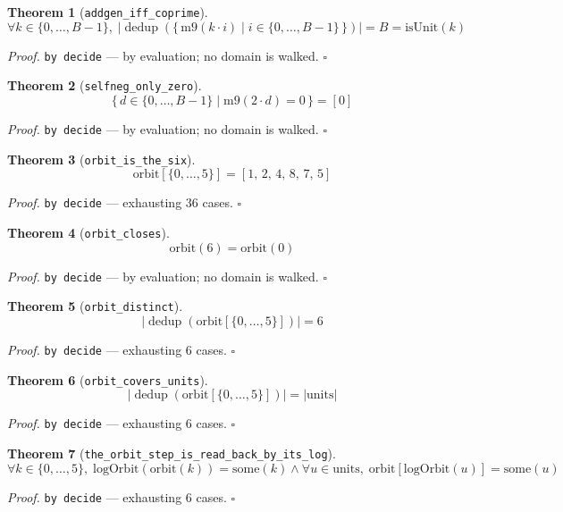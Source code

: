 \documentclass[11pt]{article}
\newtheorem{theorem}{Theorem}[section]
\begin{document}
\begin{theorem}[\texttt{addgen\_iff\_coprime}]
\[ \forall k \in \{0,\dots,B-1\},\; \left|\operatorname{dedup}\left(\{\, \mathrm{m9}\mathopen{}\left(k \cdot i\right) \mid i \in \{0,\dots,B-1\} \,\}\right)\right| = B = \mathrm{isUnit}\mathopen{}\left(k\right) \]
\end{theorem}
\noindent\emph{Proof.} \texttt{by decide} --- by evaluation; no domain is walked. \hfill$\square$

\begin{theorem}[\texttt{selfneg\_only\_zero}]
\[ \{\, d \in \{0,\dots,B-1\} \mid \mathrm{m9}\mathopen{}\left(2 \cdot d\right) = 0 \,\} = [0] \]
\end{theorem}
\noindent\emph{Proof.} \texttt{by decide} --- by evaluation; no domain is walked. \hfill$\square$

\begin{theorem}[\texttt{orbit\_is\_the\_six}]
\[ \mathrm{orbit}[\{0,\dots,5\}] = [1,\,2,\,4,\,8,\,7,\,5] \]
\end{theorem}
\noindent\emph{Proof.} \texttt{by decide} --- exhausting 36 cases. \hfill$\square$

\begin{theorem}[\texttt{orbit\_closes}]
\[ \mathrm{orbit}\mathopen{}\left(6\right) = \mathrm{orbit}\mathopen{}\left(0\right) \]
\end{theorem}
\noindent\emph{Proof.} \texttt{by decide} --- by evaluation; no domain is walked. \hfill$\square$

\begin{theorem}[\texttt{orbit\_distinct}]
\[ \left|\operatorname{dedup}\left(\mathrm{orbit}[\{0,\dots,5\}]\right)\right| = 6 \]
\end{theorem}
\noindent\emph{Proof.} \texttt{by decide} --- exhausting 6 cases. \hfill$\square$

\begin{theorem}[\texttt{orbit\_covers\_units}]
\[ \left|\operatorname{dedup}\left(\mathrm{orbit}[\{0,\dots,5\}]\right)\right| = \left|\mathrm{units}\right| \]
\end{theorem}
\noindent\emph{Proof.} \texttt{by decide} --- exhausting 6 cases. \hfill$\square$

\begin{theorem}[\texttt{the\_orbit\_step\_is\_read\_back\_by\_its\_log}]
\[ \forall k \in \{0,\dots,5\},\; \mathrm{logOrbit}\mathopen{}\left(\mathrm{orbit}\mathopen{}\left(k\right)\right) = \mathrm{some}\mathopen{}\left(k\right) \land \forall u \in \mathrm{units},\; \mathrm{orbit}[\mathrm{logOrbit}\mathopen{}\left(u\right)] = \mathrm{some}\mathopen{}\left(u\right) \]
\end{theorem}
\noindent\emph{Proof.} \texttt{by decide} --- exhausting 6 cases. \hfill$\square$
\end{document}
